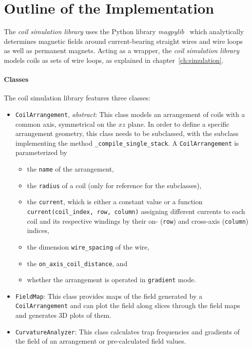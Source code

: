 \section*{Outline of the Implementation}
The \textit{coil simulation library} uses the Python library \textit{magpylib}~\cite{noauthor_magpylibmagpylib_nodate} which analytically determines magnetic fields around current-bearing straight wires and wire loops as well as permanent magnets. Acting as a wrapper, the \textit{coil simulation library} models coils as sets of wire loops, as explained in chapter~\ref{ch:simulation}.

\paragraph*{Classes}
The coil simulation library features three classes:
\begin{itemize}
    \item \texttt{CoilArrangement}, \textit{abstract}: This class models an arrangement of coils with a common axis, symmetrical on the $xz$ plane. In order to define a specific arrangement geometry, this class needs to be subclassed, with the subclass implementing the method \texttt{\_compile\_single\_stack}. A \texttt{CoilArrangement} is parameterized by
    \begin{itemize}
        \item the \texttt{name} of the arrangement,
        \item the \texttt{radius} of a coil (only for reference for the subclasses),
        \item the \texttt{current}, which is either a constant value or a function \texttt{current(coil\_index, row, column)} assigning different currents to each coil and its respective windings by their on- (\texttt{row}) and cross-axis (\texttt{column}) indices,
        \item the dimension \texttt{wire\_spacing} of the wire,
        \item the \texttt{on\_axis\_coil\_distance}, and
        \item whether the arrangement is operated in \texttt{gradient} mode.
    \end{itemize}
    \item \texttt{FieldMap}: This class provides maps of the field generated by a \texttt{CoilArrangement} and can plot the field along slices through the field maps and generates 3D plots of them.
    \item \texttt{CurvatureAnalyzer}: This class calculates trap frequencies and gradients of the field of an arrangement or pre-calculated field values.
\end{itemize}

